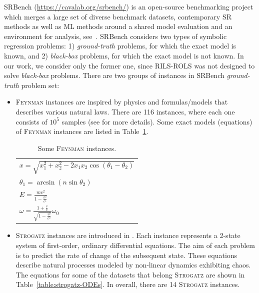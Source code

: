 \documentclass{bmcart}
\begin{document}
SRBench (\url{https://cavalab.org/srbench/}) is an open-source benchmarking project which merges a large set of diverse benchmark datasets, contemporary SR methods as well as ML methods around a shared model evaluation and an environment for analysis, see~\cite{la2021contemporary}. SRBench considers two types of symbolic regression problems: 1) \emph{ground-truth} problems, for which the exact model is known, and 2) \emph{black-box} problems, for which the exact model is not known. In our work, we consider only the former one, since \textsc{RILS-ROLS} was not designed to solve \emph{black-box} problems. There are two groups of instances in SRBench \emph{ground-truth} problem set:
\begin{itemize}
	\item \textsc{Feynman} instances are inspired by physics and formulas/models that describes various natural laws.  
	There are 116 instances, where each one consists of $10^5$  samples (see \cite{udrescu2020ai} for more details). Some exact models (equations) of \textsc{Feynman} instances are listed in Table~\ref{tab:Feynamn-Eq}.  
	
	\begin{table}[!ht]
		\centering
		\begin{tabular}{l}   \hline
			$x = \sqrt{x_1^2 + x_2^2 - 2 x_1 x_2 \cos(\theta_1 - \theta_2)}$ \\
			$ \theta_1 = \arcsin(n \sin \theta_2)$ \\
			$E =  \frac{m c^2 }{1 - \frac{v^2}{c^2}}$ \\
			$\omega = \frac{1 + \frac{v}{c}}{ \sqrt{1 - \frac{v^2}{c^2}}} \omega_0$ \\ \hline
			
		\end{tabular}
		\caption{Some \textsc{Feynman} instances.}
		\label{tab:Feynamn-Eq}
	\end{table}
	
	
	\item \textsc{Strogatz} instances are introduced in \cite{la2016inference}. 
	Each instance represents a 2-state system of first-order, ordinary differential equations. 
	The aim of each problem is to predict the rate of change of the subsequent state. These equations describe natural processes modeled by non-linear dynamics exhibiting chaos.  The equations for some of the datasets that belong \textsc{Strogatz} are shown in Table~\ref{table:strogatz-ODEs}. In overall, there are 14 \textsc{Strogatz} instances. 
	
	

\end{itemize}
\end{document}
